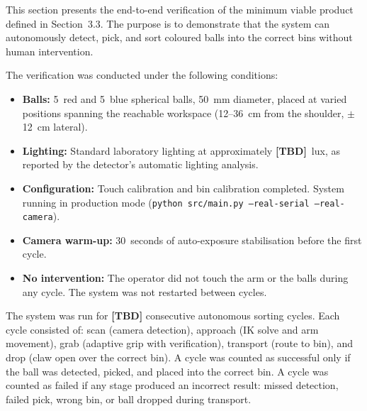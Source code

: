 
This section presents the end-to-end verification of the minimum
viable product defined in Section~3.3. The purpose is to
demonstrate that the system can autonomously detect, pick, and
sort coloured balls into the correct bins without human
intervention.


The verification was conducted under the following conditions:

\begin{itemize}
    \item \textbf{Balls:} 5~red and 5~blue spherical balls,
    50~mm diameter, placed at varied positions spanning the
    reachable workspace (12--36~cm from the shoulder, $\pm$12~cm
    lateral).
    \item \textbf{Lighting:} Standard laboratory lighting at
    approximately \textbf{[TBD]}~lux, as reported by the
    detector's automatic lighting analysis.
    \item \textbf{Configuration:} Touch calibration and bin
    calibration completed. System running in production mode
    (\texttt{python src/main.py --real-serial --real-camera}).
    \item \textbf{Camera warm-up:} 30~seconds of auto-exposure
    stabilisation before the first cycle.
    \item \textbf{No intervention:} The operator did not touch
    the arm or the balls during any cycle. The system was not
    restarted between cycles.
\end{itemize}


The system was run for \textbf{[TBD]} consecutive autonomous
sorting cycles. Each cycle consisted of: scan (camera detection),
approach (IK solve and arm movement), grab (adaptive grip with
verification), transport (route to bin), and drop (claw open over
the correct bin). A cycle was counted as successful only if the
ball was detected, picked, and placed into the correct bin. A
cycle was counted as failed if any stage produced an incorrect
result: missed detection, failed pick, wrong bin, or ball dropped
during transport.


